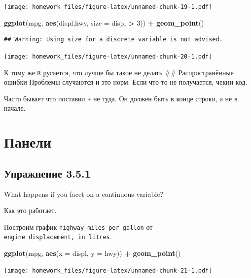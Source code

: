 \documentclass[]{book}
\newenvironment{Shaded}{\begin{snugshade}}{\end{snugshade}}
\newcommand{\KeywordTok}[1]{\textcolor[rgb]{0.13,0.29,0.53}{\textbf{#1}}}
\newcommand{\DataTypeTok}[1]{\textcolor[rgb]{0.13,0.29,0.53}{#1}}
\newcommand{\DecValTok}[1]{\textcolor[rgb]{0.00,0.00,0.81}{#1}}
\newcommand{\StringTok}[1]{\textcolor[rgb]{0.31,0.60,0.02}{#1}}
\newcommand{\OperatorTok}[1]{\textcolor[rgb]{0.81,0.36,0.00}{\textbf{#1}}}
\newcommand{\NormalTok}[1]{#1}
\begin{document}
\texttt{[image: homework\_files/figure-latex/unnamed-chunk-19-1.pdf]}

\begin{Shaded}
\begin{Highlighting}[]
 \KeywordTok{ggplot}\NormalTok{(mpg, }\KeywordTok{aes}\NormalTok{(displ,hwy, }\DataTypeTok{size =}\NormalTok{ displ }\OperatorTok{>}\StringTok{ }\DecValTok{3}\NormalTok{)) }\OperatorTok{+}
\StringTok{   }\KeywordTok{geom_point}\NormalTok{()}
\end{Highlighting}
\end{Shaded}

\begin{verbatim}
## Warning: Using size for a discrete variable is not advised.
\end{verbatim}

\texttt{[image: homework\_files/figure-latex/unnamed-chunk-20-1.pdf]}

К тому же \texttt{R} ругается, что лучше бы такое не делать \#\#
Распространённые ошибки Проблемы случаются и это норм. Если что-то не
получается, чекни код.

Часто бывает что поставил \texttt{+} не туда. Он должен быть в конце
строки, а не в начале.

\section{Панели}

\subsection*{Упражнение 3.5.1}\label{-3.5.1}

What happens if you facet on a continuous variable?

Как это работает.

Построим график \texttt{highway\ miles\ per\ gallon} от
\texttt{engine\ displacement,\ in\ litres}.

\begin{Shaded}
\begin{Highlighting}[]
\KeywordTok{ggplot}\NormalTok{(mpg, }\KeywordTok{aes}\NormalTok{(}\DataTypeTok{x =}\NormalTok{ displ, }\DataTypeTok{y =}\NormalTok{ hwy)) }\OperatorTok{+}
\StringTok{   }\KeywordTok{geom_point}\NormalTok{()}
\end{Highlighting}
\end{Shaded}

\texttt{[image: homework\_files/figure-latex/unnamed-chunk-21-1.pdf]}
\end{document}
